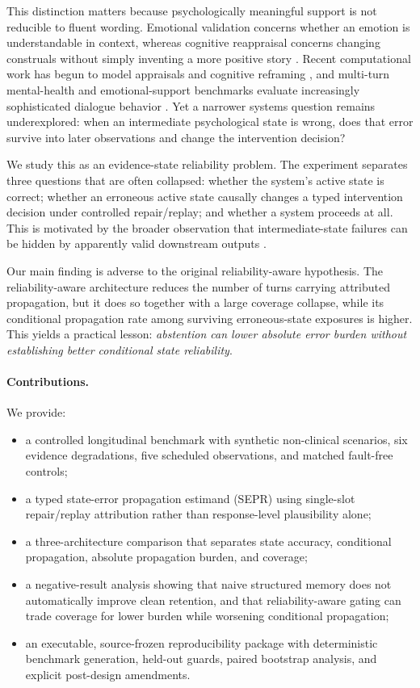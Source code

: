 \documentclass[10pt]{article}
\begin{document}
This distinction matters because psychologically meaningful support is not reducible to fluent wording. Emotional validation concerns whether an emotion is understandable in context, whereas cognitive reappraisal concerns changing construals without simply inventing a more positive story \cite{gross1998emotion,kuo2022validation,uusberg2023expanded}. Recent computational work has begun to model appraisals and cognitive reframing \cite{agarwal2025appraisals,ruder2025appraisal}, and multi-turn mental-health and emotional-support benchmarks evaluate increasingly sophisticated dialogue behavior \cite{wang2024patientpsi,zhao2024esceval}. Yet a narrower systems question remains underexplored: when an intermediate psychological state is wrong, does that error survive into later observations and change the intervention decision?

We study this as an evidence-state reliability problem. The experiment separates three questions that are often collapsed: whether the system's active state is correct; whether an erroneous active state causally changes a typed intervention decision under controlled repair/replay; and whether a system proceeds at all. This is motivated by the broader observation that intermediate-state failures can be hidden by apparently valid downstream outputs \cite{rahman2026esr}.

Our main finding is adverse to the original reliability-aware hypothesis. The reliability-aware architecture reduces the number of turns carrying attributed propagation, but it does so together with a large coverage collapse, while its conditional propagation rate among surviving erroneous-state exposures is higher. This yields a practical lesson: \emph{abstention can lower absolute error burden without establishing better conditional state reliability}.

\paragraph{Contributions.} We provide:
\begin{itemize}
  \item a controlled longitudinal benchmark with synthetic non-clinical scenarios, six evidence degradations, five scheduled observations, and matched fault-free controls;
  \item a typed state-error propagation estimand (SEPR) using single-slot repair/replay attribution rather than response-level plausibility alone;
  \item a three-architecture comparison that separates state accuracy, conditional propagation, absolute propagation burden, and coverage;
  \item a negative-result analysis showing that naive structured memory does not automatically improve clean retention, and that reliability-aware gating can trade coverage for lower burden while worsening conditional propagation;
  \item an executable, source-frozen reproducibility package with deterministic benchmark generation, held-out guards, paired bootstrap analysis, and explicit post-design amendments.
\end{itemize}
\end{document}
